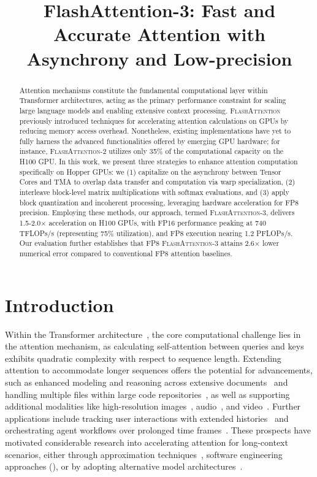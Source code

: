 \title{FlashAttention-3: Fast and Accurate Attention with Asynchrony and Low-precision}

\begin{abstract}
Attention mechanisms constitute the fundamental computational layer within Transformer architectures, acting as the primary performance constraint for scaling large language models and enabling extensive context processing. \textsc{FlashAttention} previously introduced techniques for accelerating attention calculations on GPUs by reducing memory access overhead. Nonetheless, existing implementations have yet to fully harness the advanced functionalities offered by emerging GPU hardware; for instance, \textsc{FlashAttention-2} utilizes only 35\% of the computational capacity on the H100 GPU. In this work, we present three strategies to enhance attention computation specifically on Hopper GPUs: we (1) capitalize on the asynchrony between Tensor Cores and TMA to overlap data transfer and computation via warp specialization, (2) interleave block-level matrix multiplications with softmax evaluations, and (3) apply block quantization and incoherent processing, leveraging hardware acceleration for FP8 precision. Employing these methods, our approach, termed \textsc{FlashAttention-3}, delivers 1.5-2.0$\times$ acceleration on H100 GPUs, with FP16 performance peaking at 740 TFLOPs/s (representing 75\% utilization), and FP8 execution nearing 1.2 PFLOPs/s. Our evaluation further establishes that FP8 \textsc{FlashAttention-3} attains 2.6$\times$ lower numerical error compared to conventional FP8 attention baselines.
\end{abstract}

\section{Introduction}
\label{sec:intro}

Within the Transformer architecture~\citep{vaswani2017attention}, the core computational challenge lies in the attention mechanism, as calculating self-attention between queries and keys exhibits quadratic complexity with respect to sequence length. Extending attention to accommodate longer sequences offers the potential for advancements, such as enhanced modeling and reasoning across extensive documents~\citep{guo2021longt5,shaham2022scrolls,peng2023yarn} and handling multiple files within large code repositories~\citep{roziere2023code, li2023starcoder}, as well as supporting additional modalities like high-resolution images~\citep{chen2022scaling}, audio~\citep{gulati2020conformer}, and video~\citep{ho2022video}. Further applications include tracking user interactions with extended histories~\citep{sun2019bert4rec} and orchestrating agent workflows over prolonged time frames~\citep{yao2022react}. These prospects have motivated considerable research into accelerating attention for long-context scenarios, either through approximation techniques~\citep{katharopoulos2020transformers,choromanski2020rethinking,
tay2020efficient}, software engineering approaches (\citep{rabe2021self,dao2022flashattention,kwon2023efficient}), or by adopting alternative model architectures~\citep{peng2023rwkv,sun2023retentive,gu2023mamba}.

